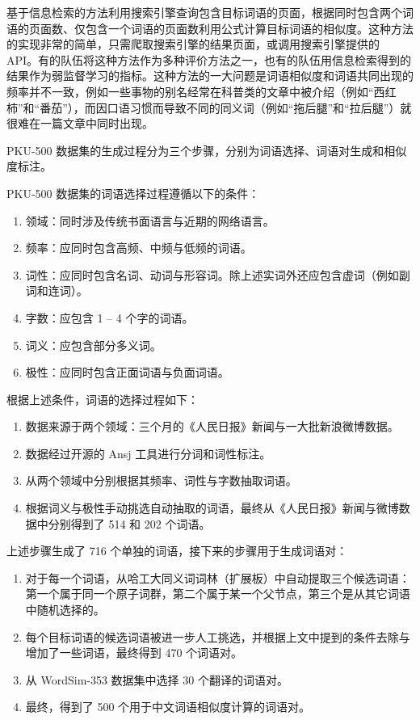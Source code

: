 基于信息检索的方法利用搜索引擎查询包含目标词语的页面，根据同时包含两个词语的页面数、仅包含一个词语的页面数利用公式计算目标词语的相似度。这种方法的实现非常的简单，只需爬取搜索引擎的结果页面，或调用搜索引擎提供的 API。有的队伍将这种方法作为多种评价方法之一，也有的队伍用信息检索得到的结果作为弱监督学习的指标。这种方法的一大问题是词语相似度和词语共同出现的频率并不一致，例如一些事物的别名经常在科普类的文章中被介绍（例如“西红柿”和“番茄”），而因口语习惯而导致不同的同义词（例如“拖后腿”和“拉后腿”）就很难在一篇文章中同时出现。

PKU-500 数据集的生成过程分为三个步骤，分别为词语选择、词语对生成和相似度标注。

PKU-500 数据集的词语选择过程遵循以下的条件：
\begin{enumerate}
	\item 领域：同时涉及传统书面语言与近期的网络语言。
	\item 频率：应同时包含高频、中频与低频的词语。
	\item 词性：应同时包含名词、动词与形容词。除上述实词外还应包含虚词（例如副词和连词）。
	\item 字数：应包含 1 -- 4 个字的词语。
	\item 词义：应包含部分多义词。
	\item 极性：应同时包含正面词语与负面词语。
\end{enumerate}
根据上述条件，词语的选择过程如下：
\begin{enumerate}
	\item 数据来源于两个领域：三个月的《人民日报》新闻与一大批新浪微博数据。
	\item 数据经过开源的 Ansj 工具进行分词和词性标注。
	\item 从两个领域中分别根据其频率、词性与字数抽取词语。
	\item 根据词义与极性手动挑选自动抽取的词语，最终从《人民日报》新闻与微博数据中分别得到了 514 和 202 个词语。
\end{enumerate}

上述步骤生成了 716 个单独的词语，接下来的步骤用于生成词语对：
\begin{enumerate}
	\item 对于每一个词语，从哈工大同义词词林（扩展板）中自动提取三个候选词语：第一个属于同一个原子词群，第二个属于某一个父节点，第三个是从其它词语中随机选择的。
	\item 每个目标词语的候选词语被进一步人工挑选，并根据上文中提到的条件去除与增加了一些词语，最终得到 470 个词语对。
	\item 从 WordSim-353 数据集中选择 30 个翻译的词语对。
	\item 最终，得到了 500 个用于中文词语相似度计算的词语对。
\end{enumerate}

